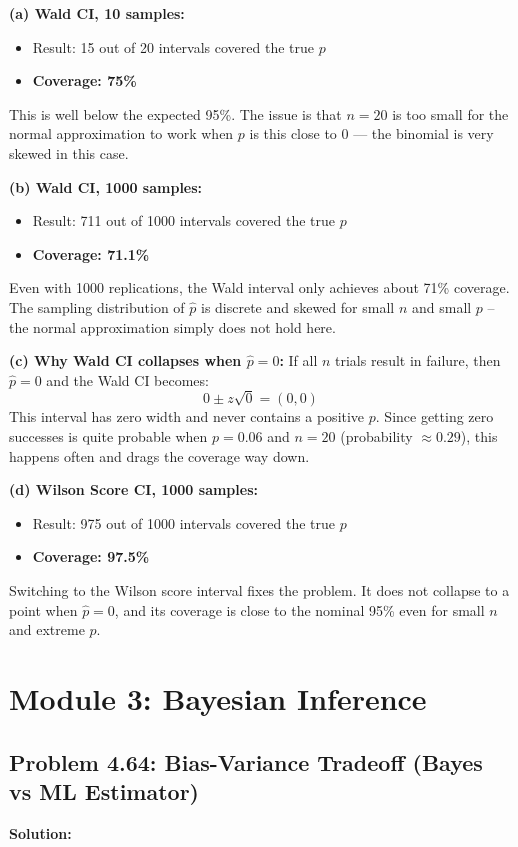 \documentclass[11pt, a4paper]{article}
\begin{document}
\textbf{(a) Wald CI, 10 samples:}
\begin{itemize}
    \item Result: 15 out of 20 intervals covered the true $p$
    \item \textbf{Coverage: 75\%}
\end{itemize}
This is well below the expected 95\%. The issue is that $n=20$ is too small for the normal approximation to work when $p$ is this close to 0 — the binomial is very skewed in this case.

\textbf{(b) Wald CI, 1000 samples:}
\begin{itemize}
    \item Result: 711 out of 1000 intervals covered the true $p$
    \item \textbf{Coverage: 71.1\%}
\end{itemize}
Even with 1000 replications, the Wald interval only achieves about 71\% coverage. The sampling distribution of $\hat{p}$ is discrete and skewed for small $n$ and small $p$ -- the normal approximation simply does not hold here.

\textbf{(c) Why Wald CI collapses when $\hat{p} = 0$:}
If all $n$ trials result in failure, then $\hat{p}=0$ and the Wald CI becomes:
$$0 \pm z\sqrt{0} = (0,0)$$
This interval has zero width and never contains a positive $p$. Since getting zero successes is quite probable when $p=0.06$ and $n=20$ (probability $\approx 0.29$), this happens often and drags the coverage way down.

\textbf{(d) Wilson Score CI, 1000 samples:}
\begin{itemize}
    \item Result: 975 out of 1000 intervals covered the true $p$
    \item \textbf{Coverage: 97.5\%}
\end{itemize}
Switching to the Wilson score interval fixes the problem. It does not collapse to a point when $\hat{p}=0$, and its coverage is close to the nominal 95\% even for small $n$ and extreme $p$.


\newpage
\section{Module 3: Bayesian Inference}

\subsection{Problem 4.64: Bias-Variance Tradeoff (Bayes vs ML Estimator)}
\textbf{Solution:}
\end{document}

